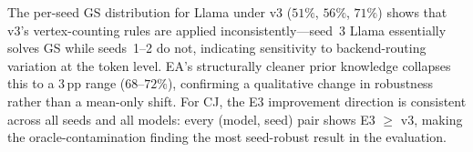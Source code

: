 \documentclass{article}
\begin{document}
The per-seed GS distribution for Llama under v3 ($51\%$, $56\%$, $71\%$) shows that
v3's vertex-counting rules are applied inconsistently---seed~3 Llama essentially solves GS
while seeds~1--2 do not, indicating sensitivity to backend-routing variation at the
token level.
EA's structurally cleaner prior knowledge collapses this to a $3$\,pp range ($68$--$72\%$),
confirming a qualitative change in robustness rather than a mean-only shift.
For CJ, the E3 improvement direction is consistent across all seeds and all models:
every (model, seed) pair shows E3 $\geq$ v3, making the oracle-contamination finding the
most seed-robust result in the evaluation.
\end{document}
